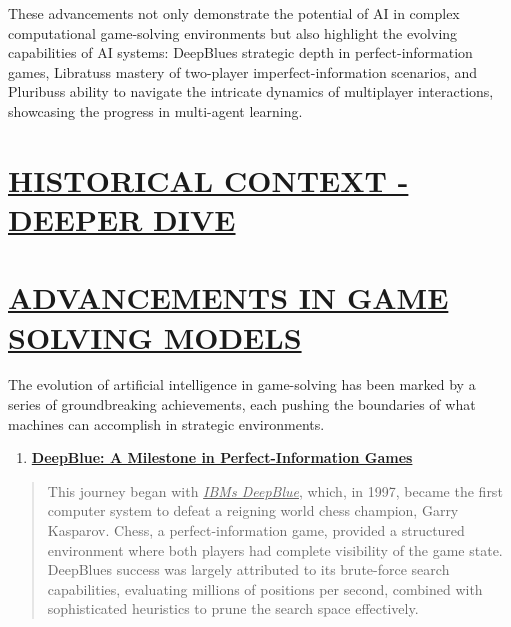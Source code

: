 \documentclass[
]{article}
\begin{document}
These advancements not only demonstrate the potential of AI in complex
computational game-solving environments but also highlight the evolving
capabilities of AI systems: DeepBlue\textquotesingle s strategic depth
in perfect-information games, Libratus\textquotesingle s mastery of
two-player imperfect-information scenarios, and
Pluribus\textquotesingle s ability to navigate the intricate dynamics of
multiplayer interactions, showcasing the progress in multi-agent
learning.

\section*{\texorpdfstring{\textbf{\ul{HISTORICAL CONTEXT - DEEPER
DIVE}}}{HISTORICAL CONTEXT - DEEPER DIVE}}\label{historical-context---deeper-dive}

\section*{\texorpdfstring{\textbf{\ul{ADVANCEMENTS IN GAME SOLVING
MODELS}}}{ADVANCEMENTS IN GAME SOLVING MODELS}}\label{advancements-in-game-solving-models}

The evolution of artificial intelligence in game-solving has been marked
by a series of groundbreaking achievements, each pushing the boundaries
of what machines can accomplish in strategic environments.

\begin{enumerate}
\def\labelenumi{\arabic{enumi}.}
\item
  \textbf{\ul{DeepBlue: A Milestone in Perfect-Information Games}}
\end{enumerate}

\begin{quote}
This journey began with \emph{\ul{IBM\textquotesingle s DeepBlue}},
which, in 1997, became the first computer system to defeat a reigning
world chess champion, Garry Kasparov. Chess, a perfect-information game,
provided a structured environment where both players had complete
visibility of the game state. DeepBlue\textquotesingle s success was
largely attributed to its brute-force search capabilities, evaluating
millions of positions per second, combined with sophisticated heuristics
to prune the search space effectively.
\end{quote}
\end{document}
